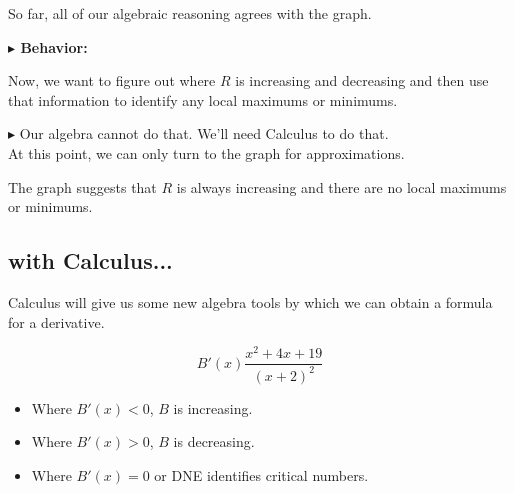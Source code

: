 \documentclass{ximera}
\begin{document}
\begin{exercise}
So far, all of our algebraic reasoning agrees with the graph.




\begin{center}
\end{center}










\textbf{\textcolor{blue!55!black}{$\blacktriangleright$ Behavior: }}  




Now, we want to figure out where $R$ is increasing and decreasing and then use that information to identify any local maximums or minimums.



\textbf{\textcolor{red!90!darkgray}{$\blacktriangleright$}} Our algebra cannot do that. We'll need Calculus to do that. \\










At this point, we can only turn to the graph for approximations.




The graph suggests that $R$ is always increasing and there are no local maximums or minimums.





\subsection{with Calculus...}



Calculus will give us some new algebra tools by which we can obtain a formula for a derivative.



\[
B'(x) \frac{x^2 + 4x + 19}{(x+2)^2}
\]



\begin{itemize}
\item Where $B'(x) < 0$, $B$ is increasing.
\item Where $B'(x) > 0$, $B$ is decreasing.
\item Where $B'(x) = 0$ or DNE identifies critical numbers.
\end{itemize}






\end{exercise}
\end{document}
